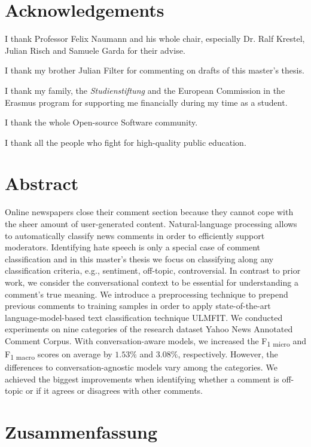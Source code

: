 \chapter*{Acknowledgements}

I thank Professor Felix Naumann and his whole chair, especially Dr. Ralf Krestel, Julian Risch and Samuele Garda for their advise.

I thank my brother Julian Filter for commenting on drafts of this master's thesis.

I thank my family, the \textit{Studienstiftung} and the European Commission in the Erasmus program for supporting me financially during my time as a student.

I thank the whole Open-source Software community.

I thank all the people who fight for high-quality public education.

\chapter*{Abstract}


Online newspapers close their comment section because they cannot cope with the sheer amount of user-generated content.
Natural-language processing allows to automatically classify news comments in order to efficiently support moderators.
Identifying hate speech is only a special case of comment classification and in this master's thesis we focus on classifying along any classification criteria, e.g., sentiment, off-topic, controversial.
In contrast to prior work, we consider the conversational context to be essential for understanding a comment's true meaning.
We introduce a preprocessing technique to prepend previous comments to training samples in order to apply state-of-the-art language-model-based text classification technique ULMFIT.
We conducted experiments on nine categories of the research dataset Yahoo News Annotated Comment Corpus.
With conversation-aware models, we increased the F\textsubscript{1 micro} and F\textsubscript{1 macro} scores on average by $1.53\%$ and $3.08\%$, respectively.
However, the differences to conversation-agnostic models vary among the  categories.
We achieved the biggest improvements when identifying whether a comment is off-topic or if it agrees or disagrees with other comments.
 
%
%


\chapter*{Zusammenfassung}

